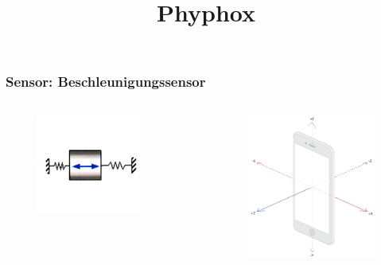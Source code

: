 \documentclass{beamer}
\title{Phyphox}
\begin{document}
\maketitle

\begin{frame}
    \frametitle{Sensor: Beschleunigungssensor} 
    \begin{columns}
        \begin{figure}[htpb]
            \centering
            \includegraphics[width=0.8\textwidth]{acc11}
        \end{figure}
        \begin{figure}[htpb]
            \centering
            \includegraphics[width=1\textwidth]{acc}
        \end{figure}
    \end{columns}
\end{frame}
\end{document}

